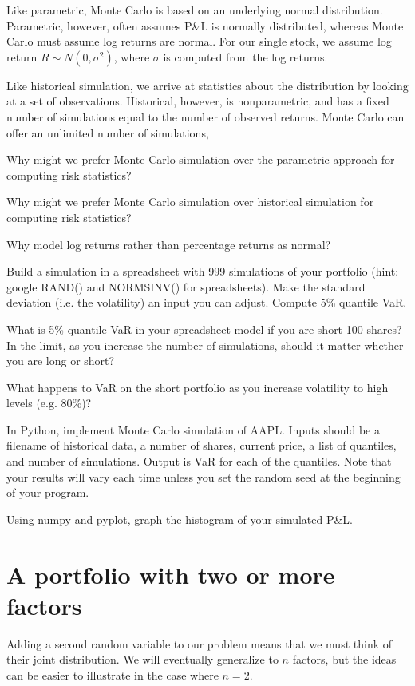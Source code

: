 \documentclass{report}
\numberwithin{problem}{chapter} %
\let\oldroblem\problem
\renewcommand{\problem}{ \oldroblem  \normalfont}
\newcommand{\pnl}{P\&L }
\newcommand{\pnlend}{P\&L}
\begin{document}
Like parametric, Monte Carlo is based on an underlying normal distribution. Parametric, however, often assumes \pnl is normally distributed, whereas Monte Carlo must assume log returns are normal. For our single stock, we assume log return $R \sim N(0, \sigma^2)$, where $\sigma$ is computed from the log returns. 

Like historical simulation, we arrive at statistics about the distribution by looking at a set of observations. Historical, however, is nonparametric, and has a fixed number of simulations equal to the number of observed returns. Monte Carlo can offer an unlimited number of simulations,

\problem Why might we prefer Monte Carlo simulation over the parametric approach for computing risk statistics?

\problem Why might we prefer Monte Carlo simulation over historical simulation for computing risk statistics?

\problem Why model log returns rather than percentage returns as normal?

\problem Build a simulation in a spreadsheet with 999 simulations of your portfolio (hint: google RAND() and NORMSINV() for spreadsheets). Make the standard deviation (i.e. the volatility) an input you can adjust.  Compute 5\% quantile VaR. 

\problem What is 5\% quantile VaR in your spreadsheet model if you are \gls{short} 100 shares? In the limit, as you increase the number of simulations, should it matter whether you are long or short? 

\problem What happens to VaR on the short portfolio as you increase volatility to high levels (e.g. 80\%)?

\problem In Python, implement Monte Carlo simulation of AAPL. Inputs should be a filename of historical data, a number of shares, current price, a list of quantiles, and number of simulations. Output is VaR for each of the quantiles. Note that your results will vary each time unless you set the random seed at the beginning of your program.

\problem Using numpy and pyplot, graph the histogram of your simulated \pnlend. 

\section{A portfolio with two or more factors}
Adding a second random variable to our problem means that we must think of their joint distribution. We will eventually generalize to $n$ factors, but the ideas can be easier to illustrate in the case where $n=2$. 
\end{document}
